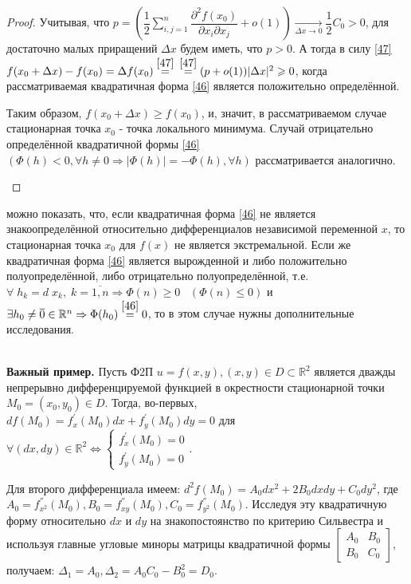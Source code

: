 \begin{proof}
	Учитывая, что $ p = \left( \dfrac{1}{2} \sum\limits_{i,j=1}^{n} \dfrac{\partial^2 f(x_0)}{\partial x_i \partial x_j} + o(1) \right) \underset{\Delta x \to 0}{\to} \dfrac{1}{2} C_0 > 0$, для достаточно малых приращений $\Delta x$ будем иметь, что $p > 0$. А тогда в силу \eqref{47} $f(x_0 + \Delta x) - f(x_0) = \Delta f(x_0)  \overset{\eqref{47}}{=} $ 
     $\overset{\eqref{47}}{=} (p + o(1)) |\Delta x|^2 \geqslant 0$, когда рассматриваемая квадратичная форма \eqref{46} является положительно определённой.

	Таким образом, $f(x_0 + \Delta x) \geqslant f(x_0)$, и, значит, в рассматриваемом случае стационарная точка $x_0$ - точка локального минимума. 
    Случай отрицательно определённой квадратичной формы \eqref{46} $(\Phi(h) < 0, \forall h \ne 0 \Rightarrow |\Phi(h)| = - \Phi(h), \forall h)$ рассматривается аналогично.
    
    $  $
\end{proof}
\begin{note}
     можно показать, что, если квадратичная форма \eqref{46} не является знакоопределённой относительно дифференциалов независимой переменной $ x $, то стационарная точка $x_0$ для $f(x)$ не является экстремальной. Если же квадратичная форма \eqref{46} является вырожденной и либо положительно полуопределённой, либо отрицательно полуопределённой, т.е. $\forall \; h_k = d \;x_k, \;k = \overline{1,n} \Rightarrow \Phi(n) \geqslant 0 \;\;\;(\Phi(n) \leqslant 0)$ и $\exists h_0 \ne \overline{0} \in \mathbb{R}^n \Rightarrow \Phi (h_0) \overset{\eqref{46}}{=}0$, то в этом случае нужны дополнительные исследования.
\end{note}

$  $
$  $\\
\textbf{Важный пример.}
	Пусть Ф2П $u = f(x,y), (x,y) \in D \subset \mathbb{R}^2$ является дважды непрерывно дифференцируемой функцией в окрестности стационарной точки $M_0 = (x_0, y_0) \in D$. Тогда, во-первых, $df(M_0) = f^{'}_x (M_0) dx + f^{'}_y (M_0) dy = 0$ для $\forall (dx, dy) \in \mathbb{R}^2 \Leftrightarrow \begin{cases}
	f^{'}_x (M_0) = 0\\
	f^{'}_y (M_0) = 0
	\end{cases}$. 
    
    Для второго дифференциала имеем: $d^2 f (M_0)  = A_0 dx^2 + 2B_0 dx dy + C_0 dy^2$, где $A_0 = f^{''}_{x^2} (M_0), B_0 = f^{''}_{xy} (M_0), C_0 = f^{''}_{y^2} (M_0)$. Исследуя эту квадратичную форму относительно $dx$ и $dy$ на знакопостоянство по критерию Сильвестра и используя главные угловые миноры матрицы квадратичной формы $\begin{bmatrix}
	A_0 & B_0           \\[0.3em]
	B_0 & C_0
	\end{bmatrix}$, получаем:
	$\Delta_1 = A_0, \Delta_2 = A_0 C_0 - B_0^2 = D_0$. 
    
